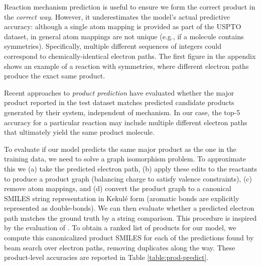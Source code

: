 Reaction mechanism prediction is useful to ensure we form the correct product in the {\em correct way}.
However, it underestimates the model's actual predictive accuracy: although a single atom mapping is provided as part of the USPTO dataset, in general atom mappings are not unique (e.g., if a molecule contains symmetries). Specifically, multiple different sequences of integers could correspond to chemically-identical electron paths. 
The first figure in the appendix shows an example of a reaction with symmetries, where different electron paths produce the exact same product. 

Recent approaches to {\em product prediction} \citep{jin2017predicting,schwaller2017found}
have evaluated whether the major product reported in the test dataset matches predicted candidate products generated by their system, independent of mechanism.
In our case, the top-5 accuracy for a particular reaction may include multiple different electron paths that ultimately yield the same product molecule.

To evaluate if our model predicts the same major product as the one in the training data, we need to solve a graph isomorphism problem. To approximate this 
we (a) take the predicted electron path, 
(b) apply these edits to the reactants to produce a product graph (balancing charge to satisfy valence constraints), 
(c) remove atom mappings,
and (d) convert the product graph to a canonical SMILES string representation in Kekul\'e form (aromatic bonds are explicitly represented as double-bonds). 
We can then evaluate whether a predicted electron path matches the ground truth by a string comparison. This procedure is inspired by the evaluation of \citet{schwaller2017found}. To obtain a ranked list of products for our model, we compute this canonicalized product SMILES for each of the predictions found by beam search over electron paths, removing duplicates along the way. 
These product-level accuracies are reported in Table \ref{table:prod-predict}.


